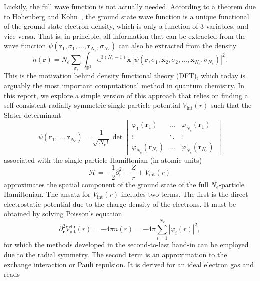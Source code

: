 \documentclass[a4paper,DIV=12,english]{scrartcl}
\begin{document}
Luckily, the full wave function is not actually needed. According to a theorem due to Hohenberg and Kohn~\cite{kohn_hohenberg}, the ground state wave function is a unique functional of the ground state electron density, which is only a function of 3 variables, and vice versa. That is, in principle, all information that can be extracted from the wave function $\psi(\textbf{r}_1,\sigma_1, \dots, \textbf{r}_{N_e},\sigma_{N_e})$ can also be extracted from the density
\begin{equation}
    n(\textbf{r}) = N_e \sum_{\sigma_i}\int_{\mathbb{R}^3} \text{d}^{3(N_e-1)}\textbf{x}\,\left|\psi(\textbf{r},\sigma_1,\textbf{x}_2,\sigma_2,\dots,\textbf{x}_{N_e},\sigma_{N_e})\right|^2.
\end{equation}
This is the motivation behind density functional theory (DFT), which today is arguably the most important computational method in quantum chemistry. In this report, we explore a simple version of this approach that relies on finding a self-consistent radially symmetric single particle potential $V_\text{int}(r)$ such that the Slater-determinant
\begin{equation}
    \psi(\textbf{r}_1, \dots, \textbf{r}_{N_e}) = \frac{1}{\sqrt{N_e!}}\det 
    \begin{bmatrix}
\varphi_1(\textbf{r}_1) &\dots &\varphi_{N_e}(\textbf{r}_{1}) \\
\vdots & \ddots & \vdots \\
\varphi_{N_e}(\textbf{r}_{N_e}) &\dots &\varphi_{N_e}(\textbf{r}_{N_e}) 
    \end{bmatrix}
\end{equation} 
associated with the single-particle Hamiltonian (in atomic units)
\begin{equation}\label{eq:seq}
    \mathcal{H} = -\frac{1}{2}\partial_\textbf{r}^2 - \frac{Z}{r} + V_\text{int}(r)
\end{equation}
approximates the spatial component of the ground state of the full $N_e$-particle Hamiltonian. The ansatz for $V_\text{int}(r)$ includes two terms. The first is the direct electrostatic potential due to the charge density of the electrons. It must be obtained by solving Poisson's equation
\begin{equation}
    \partial_\textbf{r}^2 V_\text{int}^{\text{dir}}({r})= -4\pi n({r}) = -4\pi \sum_{i=1}^{N_e} \left|\varphi_i({r})\right|^2,
\end{equation}
for which the methods developed in the second-to-last hand-in can be employed due to the radial symmetry. The second term is an approximation to the exchange interaction or Pauli repulsion. It is derived for an ideal electron gas and reads
\end{document}
